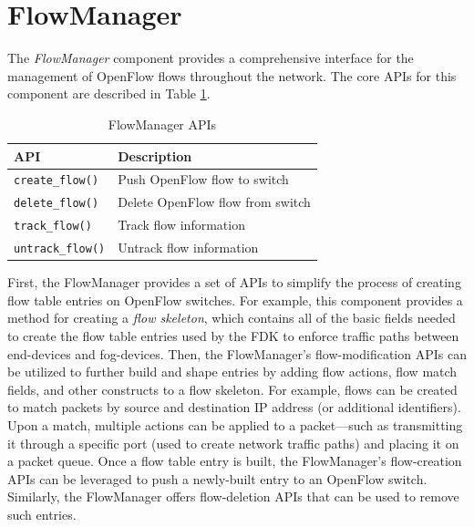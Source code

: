 \section{FlowManager}
\label{FlowManager}
%
The \textit{FlowManager} component provides a comprehensive interface for the management of OpenFlow flows throughout the network.
The core APIs for this component are described in Table \ref{tab:flowAPIs}.
%
%
\begin{table}[t]
    \centering
    \caption{FlowManager APIs}
    \begin{tabular}{|l|p{7cm}|}
    \hline
    \textbf{API} & \textbf{Description} \\ \hline \hline
    \texttt{\scriptsize{create\_flow()}} & Push OpenFlow flow to switch\\ \hline
    \texttt{\scriptsize{delete\_flow()}} & Delete OpenFlow flow from switch \\ \hline
    \texttt{\scriptsize{track\_flow()}} & Track flow information \\ \hline
    \texttt{\scriptsize{untrack\_flow()}} & Untrack flow information \\ \hline
    \end{tabular}
    \label{tab:flowAPIs}
\end{table}
%
%
First, the FlowManager provides a set of APIs to simplify the process of creating flow table entries on OpenFlow switches.
For example, this component provides a method for creating a \textit{flow skeleton}, which contains all of the basic fields needed to create the flow table entries used by the FDK to enforce traffic paths between end-devices and fog-devices.
Then, the FlowManager's flow-modification APIs can be utilized to further build and shape entries by adding flow actions, flow match fields, and other constructs to a flow skeleton.
For example, flows can be created to match packets by source and destination IP address (or additional identifiers).
Upon a match, multiple actions can be applied to a packet---such as transmitting it through a specific port (used to create network traffic paths) and placing it on a packet queue.
Once a flow table entry is built, the FlowManager's flow-creation APIs can be leveraged to push a newly-built entry to an OpenFlow switch. Similarly, the FlowManager offers flow-deletion APIs that can be used to remove such entries.


